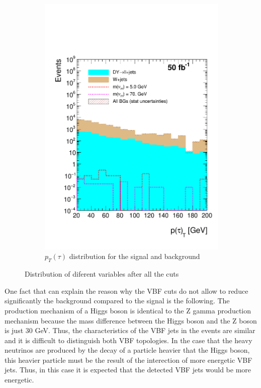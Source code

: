 \begin{figure}[h]
\begin{subfigure}{.5\textwidth}
  \includegraphics[width=1.1\linewidth]{./Capitulos/Analysis/AfterVBFCUTS/TauPt_MET20}
  \caption{$p_T(\tau)$ distribution for the signal and background}
  \label{taupt_VBF}
\end{subfigure}
\caption{Distribution of diferent variables after all the cuts}
\label{Variables_bjets}
\end{figure}
 
One fact that can explain the reason why the VBF cuts do not allow to reduce significantly the background compared to the signal is the following. The production mechanism of a Higgs boson is identical to the Z gamma production mechanism because the mass difference between the Higgs boson and the Z boson is just 30 GeV. Thus, the characteristics of the VBF jets in the events are similar and it is difficult to distinguish both VBF topologies. In the case that the heavy neutrinos are produced by the decay of a particle heavier that the Higgs boson, this heavier particle must be the result of the interection of more energetic VBF jets. Thus, in this case it is expected that the detected VBF jets would be more energetic.  
 
 
 
 
 
 
 
 